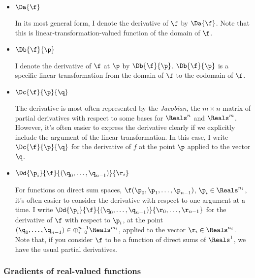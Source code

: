 \begin{itemize}

\item $\Da{\f}$

In its most general form,
I denote the derivative of $\f$ by $\Da{\f}$.
Note that this is
linear-transformation-valued function of the domain of $\f$.

\item $\Db{\f}{\p}$

I denote the derivative of $\f$ at $\p$ by $\Db{\f}{\p}$.
$\Db{\f}{\p}$ is a specific linear transformation from
the domain of $\f$ to the codomain of $\f$.

\item $\Dc{\f}{\p}{\q}$

The derivative is most often represented by the {\it Jacobian},
the $m \times n$ matrix of partial derivatives
with respect to some bases for $\Reals^n$ and $\Reals^m$.
However, it's often easier to express the derivative clearly if we
explicitly include the argument of the linear transformation.
In this case, I write $\Dc{\f}{\p}{\q}$
for the derivative of $f$ at the point $\p$
applied to the vector $\q$.

\item $\Dd{\p_i}{\f}{(\q_0,\ldots,\q_{n-1})}{\r_i}$

For functions on direct sum spaces,
$\f(\p_0,\p_1,\ldots,\p_{n-1})$, $\p_i \in \Reals^{n_i}$,
it's often easier to consider the derivative
with respect to one argument at a time.
I write $\Dd{\p_i}{\f}{(\q_0,\ldots,\q_{n-1})}{\r_0,\ldots,\r_{n-1}}$
for the derivative of $\f$ with respect to $\p_i$,
at the point $(\q_0,\ldots,\q_{n-1}) \in \oplus_{i=0}^{n-1} \Reals^{m_i}$,
applied to the vector $\r_i \in \Reals^{n_i}$.
Note that, if you consider $\f$ to be a function
of direct sums of $\Reals^1$, we have the usual
partial derivatives.

\end{itemize}



\subsubsection{Gradients of real-valued functions}
\label{sec:gradients}

